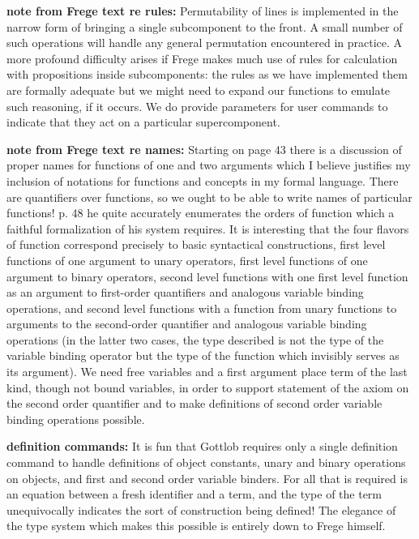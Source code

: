 \documentclass{article}
\begin{document}
{{{\bf note from Frege text re rules:}  Permutability of lines is implemented in the narrow form of bringing a single subcomponent to the front.  A small number of such operations will
handle any general permutation encountered in practice.  A more profound difficulty arises if Frege makes much use of rules for calculation with propositions inside subcomponents:  the rules as we have implemented them are formally adequate but we might need to expand our functions to emulate such reasoning, if it occurs.  We do provide parameters for user commands to indicate that they act on a particular supercomponent.

{\bf note from Frege text re names:}  Starting on page 43 there is a discussion of proper names for functions of one and two arguments which I believe justifies my inclusion of
notations for functions and concepts in my formal language.   There are quantifiers over functions, so we ought to be able to write names of particular functions!  p. 48 he quite accurately enumerates the orders of function which a faithful formalization of his system requires.  It is interesting that the four flavors of function correspond precisely to basic syntactical constructions,
first level functions of one argument to unary operators, first level functions of one argument to binary operators, second level functions with one first level function as an argument to first-order quantifiers and analogous variable binding operations, and second level functions with a function from unary functions to arguments to the second-order quantifier and analogous variable binding operations (in the latter two cases, the type described is not the type of the variable binding operator but the type of the function which invisibly serves as its argument).  We need  free variables and a first argument place term of the last kind, though not bound variables, in order to support statement of the axiom on the second order quantifier and to make definitions of second order variable binding operations possible.

{\bf definition commands:}  It is fun that Gottlob requires only a single definition command to handle definitions of object constants, unary and binary operations on objects, and first and second order variable binders.  For all that is required is an equation between a fresh identifier and a term, and the type of the term unequivocally indicates the sort of construction being defined!   The elegance of the type system which makes this possible is entirely down to Frege himself.

}}
\end{document}
